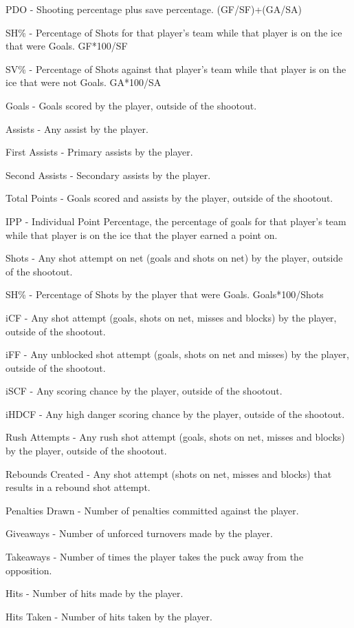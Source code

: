 \documentclass[12pt]{article}
\begin{document}
PDO - Shooting percentage plus save percentage. (GF/SF)+(GA/SA)

SH\% - Percentage of Shots for that player's team while that player is on the ice that were Goals. GF*100/SF

SV\% - Percentage of Shots against that player's team while that player is on the ice that were not Goals. GA*100/SA

Goals - Goals scored by the player, outside of the shootout.

Assists - Any assist by the player.

First Assists - Primary assists by the player.

Second Assists - Secondary assists by the player.

Total Points - Goals scored and assists by the player, outside of the shootout.

IPP - Individual Point Percentage, the percentage of goals for that player's team while that player is on the ice that the 
player earned a point on. 

Shots - Any shot attempt on net (goals and shots on net) by the player, outside of the shootout.

SH\% - Percentage of Shots by the player that were Goals. Goals*100/Shots

iCF - Any shot attempt (goals, shots on net, misses and blocks) by the player, outside of the shootout.

iFF - Any unblocked shot attempt (goals, shots on net and misses) by the player, outside of the shootout.

iSCF - Any scoring chance by the player, outside of the shootout.

iHDCF - Any high danger scoring chance by the player, outside of the shootout.

Rush Attempts - Any rush shot attempt (goals, shots on net, misses and blocks) by the player, outside of the shootout.

Rebounds Created - Any shot attempt (shots on net, misses and blocks) that results in a rebound shot attempt.

Penalties Drawn - Number of penalties committed against the player.

Giveaways - Number of unforced turnovers made by the player.

Takeaways - Number of times the player takes the puck away from the opposition.

Hits - Number of hits made by the player.

Hits Taken - Number of hits taken by the player.
\end{document}
